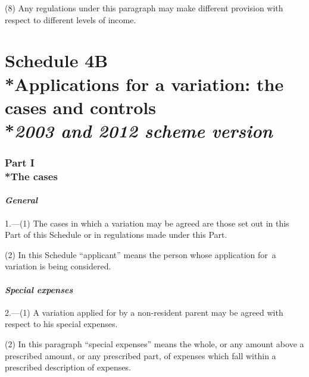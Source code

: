 \documentclass[12pt,a4paper]{article}
\begin{document}
(8) Any regulations under this paragraph may make different provision with respect to different levels of income.

\part[Schedule 4B --- Applications for a variation: the cases and controls --- \emph{2003 and 2012 scheme version}]{\noindent S\lowercase{CHEDULE} 4B\\*Applications for a variation: the cases and controls\\*\emph{2003 and 2012 scheme version}}


\section[Part I --- The cases]{Part I\\*The cases}

\subsection*{\itshape General}

1.---(1) The cases in which a variation may be agreed are those set out in this Part of this Schedule or in regulations made under this Part.

(2) In this Schedule “applicant” means the person whose application for~a variation is being considered.

\subsection*{\itshape Special expenses}

2.---(1) A variation applied for by a non-resident parent may be agreed with respect to his special expenses.

(2) In this paragraph “special expenses” means the whole, or any amount above a prescribed amount, or any prescribed part, of expenses which fall within a prescribed description of expenses.
\end{document}

